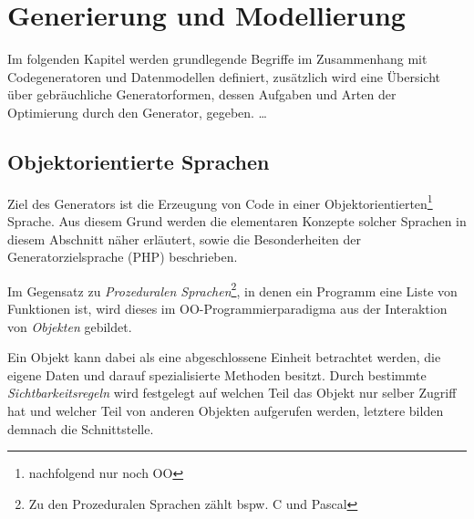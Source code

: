 \chapter{Generierung und Modellierung}
\label{chap:generation_and_modeling}


Im folgenden Kapitel werden grundlegende Begriffe im Zusammenhang mit Codegeneratoren und Datenmodellen definiert, zusätzlich wird eine Übersicht über gebräuchliche Generatorformen, dessen Aufgaben und Arten der Optimierung durch den Generator, gegeben. 
 \ldots





\section{Objektorientierte Sprachen}
\label{sec:target_language}

Ziel des Generators ist die Erzeugung von Code in einer Objektorientierten\footnote{nachfolgend nur noch OO} Sprache. Aus diesem Grund werden die elementaren Konzepte solcher Sprachen in diesem Abschnitt näher erläutert, sowie die Besonderheiten der Generatorzielsprache (PHP) beschrieben.

Im Gegensatz zu \emph{Prozeduralen Sprachen}\footnote{Zu den Prozeduralen Sprachen zählt bspw. C und Pascal}, in denen ein Programm eine Liste von Funktionen ist, wird dieses im OO-Programmierparadigma aus der Interaktion von \emph{Objekten} gebildet. 

Ein Objekt kann dabei als eine abgeschlossene Einheit betrachtet werden, die eigene Daten und darauf spezialisierte Methoden besitzt. Durch bestimmte \emph{Sichtbarkeitsregeln} wird festgelegt auf welchen Teil das Objekt nur selber Zugriff hat und welcher Teil von anderen Objekten aufgerufen werden, letztere bilden demnach die Schnittstelle.


